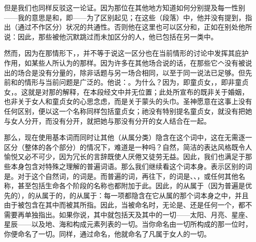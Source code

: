 但是我们也同样反驳这一论证。因为那位在其他地方知道如何分别提及每一性别——我的意思是和，即——为了区别起见；在这些（段落）中，他并没有提到，指出（通过不作区分）状况的共通性。否则他在这里也可以区分和，正如在别处他所说：因此，那些被他沉默跳过而未加区分的人，他已包括在另一类中。\par

然而，因为在那情形下，，并不等于说这一区分也在当前情形的讨论中发挥其庇护作用，如某些人所认为的那样。因为许多在其他场合说的话，在那些它𠆢没有被说出的场合是没有分量的，除非话题与另一场合相同，以至于同一说法已足够。但先前和的情形与当前问题是广泛的。他说：。为什么？因为，即童贞女，，即非童贞女，。这就是对那的解释，在本段经文中并无位置；此处所宣布的既非关于婚姻，也非关于女人和童贞女的心思念虑，而是关于蒙头的头巾。圣神愿意在这事上没有任何区别，便以这一个名称同样包括童贞女；祂没有特别提名童贞女，就没有把她与女人分开，而没有分开，就把她与那没有分开的女人结合在一起。\par

那么，现在使用基本词而同时让其他（从属分类）隐含在这个词中，这在无需逐一区分（整体的各个部分）的情况下，难道是一种吗？自然，简洁的表达风格既令人愉悦又必不可少，因为冗长的言辞既使人厌倦又徒劳无益。因此，我们也满足于那些本身包含对特殊之理解的普遍词语。那么我们继续看这个词本身。表示区别的词是。对于这个自然词，的词是。而普遍的词，再往下，的词是、、，或任何其他名称，甚至包括生命各个阶段的名称也都附加于此。因此，的从属于（因为普遍是优先的），的从属于的，的从属于：每一项都隐含在它从属的那个词本身之中，并且由于被包含在其中而被其所指。因此，当被命名时，无论是、还是任何一个，都不需要再单独指出。如果你说，其中就包括天及其中的一切——太阳、月亮、星座、星辰——以及地、海和构成元素列表的一切。当你命名由一切所构成的那一位时，你便命名了一切。同样，通过命名，他就命名了凡属于女人的一切。\par


